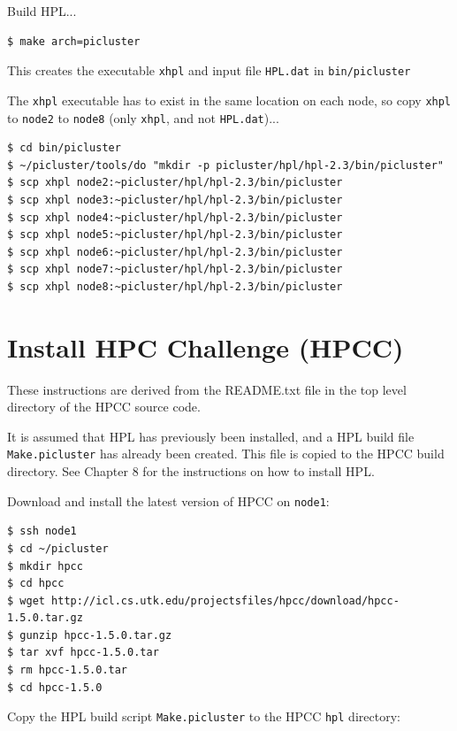 \documentclass{report}
\begin{document}
\lstset{style=listing}


Build HPL...

\lstset{style=type}
\begin{lstlisting}
$ make arch=picluster   
\end{lstlisting}

This creates the executable \verb|xhpl| and input file \verb|HPL.dat| in \verb|bin/picluster|

The \verb|xhpl| executable has to exist in the same location on each node, so copy \verb|xhpl| to \verb|node2| to \verb|node8| (only \verb|xhpl|, and not \verb|HPL.dat|)...

\lstset{style=type}
\begin{lstlisting}
$ cd bin/picluster
$ ~/picluster/tools/do "mkdir -p picluster/hpl/hpl-2.3/bin/picluster"
$ scp xhpl node2:~picluster/hpl/hpl-2.3/bin/picluster
$ scp xhpl node3:~picluster/hpl/hpl-2.3/bin/picluster
$ scp xhpl node4:~picluster/hpl/hpl-2.3/bin/picluster
$ scp xhpl node5:~picluster/hpl/hpl-2.3/bin/picluster
$ scp xhpl node6:~picluster/hpl/hpl-2.3/bin/picluster
$ scp xhpl node7:~picluster/hpl/hpl-2.3/bin/picluster
$ scp xhpl node8:~picluster/hpl/hpl-2.3/bin/picluster
\end{lstlisting}


%
%
\chapter{Install HPC Challenge (HPCC)}

These instructions are derived from the README.txt file in the top level directory of the HPCC source code.

It is assumed that HPL has previously been installed, and a HPL build file \verb|Make.picluster| has already been created. This file is copied to the HPCC build directory. See Chapter 8 for the instructions on how to install HPL.

Download and install the latest version of HPCC on \verb|node1|:

\lstset{style=type}
\begin{lstlisting}
$ ssh node1
$ cd ~/picluster
$ mkdir hpcc
$ cd hpcc
$ wget http://icl.cs.utk.edu/projectsfiles/hpcc/download/hpcc-1.5.0.tar.gz
$ gunzip hpcc-1.5.0.tar.gz
$ tar xvf hpcc-1.5.0.tar
$ rm hpcc-1.5.0.tar
$ cd hpcc-1.5.0
\end{lstlisting}

Copy the HPL build script \verb|Make.picluster| to the HPCC \verb|hpl| directory:
\end{document}
